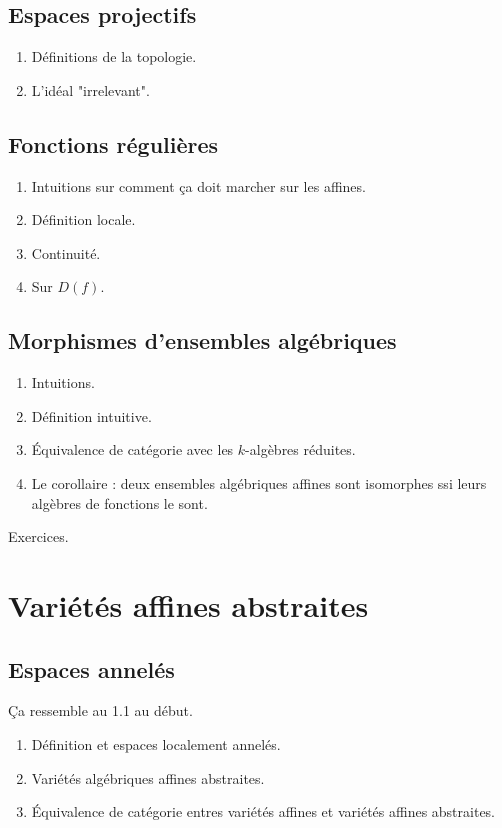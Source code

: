 \documentclass[a4paper,12pt]{book}
\theoremstyle{plain}
\theoremstyle{definition}
\theoremstyle{remark}
\begin{document}
\subsection{Espaces projectifs}
\begin{enumerate}
    \item Définitions de la topologie.
    \item L'idéal "irrelevant".
\end{enumerate}
\subsection{Fonctions régulières}
\begin{enumerate}
    \item Intuitions sur comment ça doit marcher sur les affines.
    \item Définition locale.
    \item Continuité.
    \item Sur $D(f)$.
\end{enumerate}
\subsection{Morphismes d'ensembles algébriques}
\begin{enumerate}
    \item Intuitions.
    \item Définition intuitive.
    \item Équivalence de catégorie avec les $k$-algèbres réduites.
    \item Le corollaire : deux ensembles algébriques affines sont 
	isomorphes ssi leurs algèbres de fonctions le sont.
\end{enumerate}
Exercices.

\section{Variétés affines abstraites}
\subsection{Espaces annelés}
Ça ressemble au 1.1 au début.
\begin{enumerate}
    \item Définition et espaces localement annelés.
    \item Variétés algébriques affines abstraites.
    \item Équivalence de catégorie entres variétés affines et variétés
	affines abstraites.
\end{enumerate}
\end{document}
